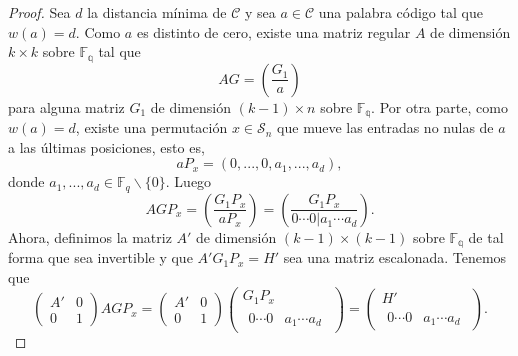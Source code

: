 \begin{proof}
    Sea $d$ la distancia mínima de $\mathcal{C}$ y sea $a \in \mathcal{C}$ una palabra código tal que $w(a) = d$. Como $a$ es distinto de cero, existe una matriz regular $A$ de dimensión $k \times k$ sobre $\mathbb{F_q}$ tal que 
    \[
        AG = \left( \frac{G_1}{a} \right)
    \]
    para alguna matriz $G_1$ de dimensión $(k-1) \times n$ sobre $\mathbb{F_q}$. Por otra parte, como $w(a) = d$, existe una permutación $x \in \mathcal{S}_n$ que mueve las entradas no nulas de $a$ a las últimas posiciones, esto es,
    \[
        aP_x = (0, ..., 0, a_1, ..., a_d),
    \]
    donde $a_1, ..., a_d \in \mathbb{F}_q \backslash \{ 0 \}$. Luego
    \[
        AGP_x = \left( \frac{G_1 P_x}{a P_x} \right) = \left( \frac{G_1 P_x}{0 \cdots 0 \vert a_1 \cdots a_d} \right).
    \]
    Ahora, definimos la matriz $A'$ de dimensión $(k-1) \times (k-1)$ sobre $\mathbb{F_q}$ de tal forma que sea invertible y que $A'G_1P_x = H'$ sea una matriz escalonada. Tenemos que
    \begin{equation}
        \label{eq:matriz_bloques}
        \left( 
            \begin{array}{c|c} 
                A' & 0 \\
                \hline
                0 & 1
            \end{array}
        \right)
        AGP_x
        =
        \left( 
            \begin{array}{c|c} 
                A' & 0 \\
                \hline
                0 & 1
            \end{array}
        \right)
        \left( 
            \begin{array}{c} 
                G_1P_x \\
                \hline
                \begin{array}{c|c}
                    0 \cdots 0 & a_1 \cdots a_d
                \end{array}
            \end{array}
        \right)
        = 
        \left( 
            \begin{array}{c} 
                H' \\
                \hline
                \begin{array}{c|c}
                    0 \cdots 0 & a_1 \cdots a_d
                \end{array}
            \end{array}
        \right).
    \end{equation}

\end{proof}

